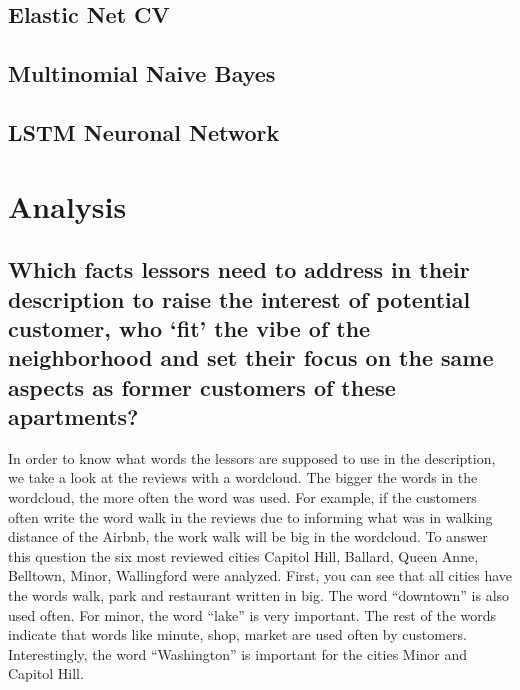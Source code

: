 \subsection{Elastic Net CV}
\subsection{Multinomial Naive Bayes}
\subsection{LSTM Neuronal Network}



\section{Analysis}
\subsection{Which facts lessors need to address in their description to raise the interest of potential customer, who ‘fit’ the vibe of the neighborhood and set their focus on the same aspects as former customers of these apartments?}
In order to know what words the lessors are supposed to use in the description, we take a look at the reviews with a wordcloud. The bigger the words in the wordcloud, the more often the word was used. For example, if the customers often write the word walk in the reviews due to informing what was in walking distance of the Airbnb, the work walk will be big in the wordcloud. 
To answer this question the six most reviewed cities Capitol Hill, Ballard, Queen Anne, Belltown, Minor, Wallingford were analyzed. First, you can see that all cities have the words walk, park and restaurant written in big. The word “downtown” is also used often. For minor, the word “lake” is very important. The rest of the words indicate that words like minute, shop, market are used often by customers. Interestingly, the word “Washington” is important for the cities Minor and Capitol Hill.


